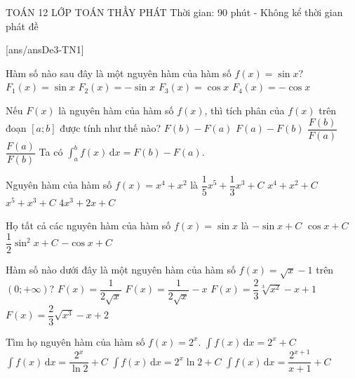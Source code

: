 \begin{name}
	{\tenchude}
	{TOÁN 12}
	{LỚP TOÁN THẦY PHÁT}
	{Thời gian: 90 phút - Không kể thời gian phát đề}
\end{name}
\TN
{}[ans/ansDe3-TN1]
\begin{ex}%
	Hàm số nào sau đây là một nguyên hàm của hàm số $f(x) = \sin x$?
	\choice
	{$F_{1}(x) = \sin x$}
	{$F_{2}(x) = -\sin x$}
	{$F_{3}(x) = \cos x$}
	{\True $F_{4}(x) = -\cos x$}
\end{ex}

\begin{ex}%
	Nếu $F(x)$ là nguyên hàm của hàm số $f(x)$, thì tích phân của $f(x)$ trên đoạn $[a;b]$ được tính như thế nào?
	\choice
	{\True $F(b)-F(a)$}
	{$F(a)-F(b)$}
	{$\dfrac{F(b)}{F(a)}$}
	{$\dfrac{F(a)}{F(b)}$}
	\loigiai
	{ Ta có
		$\displaystyle\int_{a}^{b} f(x) \mathrm{\,d}x = F(b) - F(a)$.
	}
\end{ex}

\begin{ex}%
	Nguyên hàm của hàm số $f(x)=x^4+x^2$ là
	\choice
	{\True $\dfrac{1}{5}x^5+\dfrac{1}{3}x^3+C$}
	{$x^4+x^2+C$}
	{$x^5+x^3+C$}
	{$4x^3+2x+C$}
\end{ex}

\begin{ex}%
	Họ tất cả các nguyên hàm của hàm số $f(x)=\sin x$ là
	\choice
	{$-\sin x+C$}
	{$\cos x+C$}
	{$\dfrac{1}{2}\sin^2x+C$}
	{\True $-\cos x+C$}
\end{ex}

\begin{ex}%
	Hàm số nào dưới đây là một nguyên hàm của hàm số $f(x)=\sqrt{x}-1$ trên $(0;+\infty)$?
	\choice
	{$F(x)=\dfrac{1}{2\sqrt{x}}$}
	{$F(x)=\dfrac{1}{2\sqrt{x}}-x$}
	{$F(x)=\dfrac{2}{3}\sqrt[3]{x^2}-x+1$}
	{\True $F(x)=\dfrac{2}{3}\sqrt{x^3}-x+2$}
\end{ex}

\begin{ex}%
	Tìm họ nguyên hàm của hàm số $f(x)=2^x$.
	\choice
	{$\displaystyle\int f(x)\mathrm{\,d}x=2^x+C$}
	{\True $\displaystyle\int f(x)\mathrm{\,d}x=\dfrac{2^x}{\ln 2}+C$}
	{$\displaystyle\int f(x)\mathrm{\,d}x=2^x\ln 2+C$}
	{$\displaystyle\int f(x)\mathrm{\,d}x=\dfrac{2^{x+1}}{x+1}+C$}
\end{ex}

